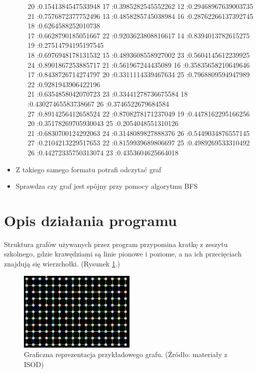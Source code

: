 \documentclass{article}
\begin{document}
\begin{itemize}
\begin{itemize}
{	 20 :0.1541384547533948  17 :0.3985282545552262  12 :0.29468967639003735 \\
	 21 :0.7576872377752496  13 :0.4858285745038984  16 :0.28762266137392745  18 :0.6264588252010738 \\
	 17 :0.6628790185051667  22 :0.9203623808816617  14 :0.8394013782615275  19 :0.27514794195197545 \\
	 18 :0.6976948178131532  15 :0.4893608558927002  23 :0.5604145612239925\\ 
	 24 :0.8901867253885717  21 :0.561967244435089  16 :0.35835658210649646 \\
	 17 :0.8438726714274797  20 :0.3311114339467634  25 :0.7968809594947989  22 :0.9281943906422196 \\
	 21 :0.6354858042070723  23 :0.33441278736675584  18 :0.43027465583738667  26 :0.3746522679684584 \\
	 27 :0.8914256412658524  22 :0.8708278171237049  19 :0.4478162295166256 \\
	 20 :0.35178269705930043  25 :0.2054048551310126 \\
	 21 :0.6830700124292063  24 :0.3148089827888376  26 :0.5449034876557145 \\
	 27 :0.2104213229517653  22 :0.8159939689806697  25 :0.4989269533310492 \\
	 26 :0.44272335750313074  23 :0.4353604625664018\\}
\end{itemize}
\item Z takiego samego formatu potrafi odczytać graf
\item Sprawdza czy graf jest spójny przy pomocy algorytmu BFS
\end{itemize}

\section{Opis działania programu}
Struktura grafów używanych przez program przypomina kratkę z zeszytu szkolnego, gdzie krawędziami są linie pionowe i poziome, a na ich przecięciach znajdują się wierzchołki. (Rysunek \ref{fig:graf}.)

\begin{figure}[h]
\centering
\includegraphics[width=0.5\textwidth]{grafik.jpg}
\caption{\label{fig:graf}Graficzna reprezentacja przykładowego grafu. (Źródło: materiały z ISOD)}
\end{figure}
\end{document}
